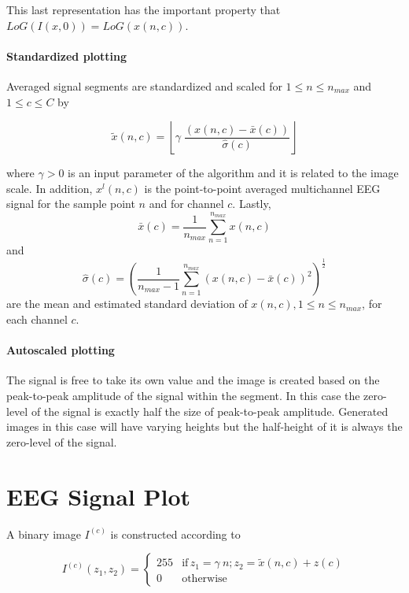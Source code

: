 This last representation has the important property that $ LoG(I(x,0)) = LoG(x(n,c)) $.

\paragraph{Standardized plotting}

Averaged signal segments are standardized and scaled for $1 \leq n \leq n_{max}$ and $1 \leq c \leq C$ by 

\begin{equation}
\tilde{x}(n,c) = \left \lfloor{ \gamma \; \frac{( x(n,c) - \bar{x}(c)  )}{ \hat{\sigma}(c) } }\right \rfloor
\label{eq:standarizedaverages}
\end{equation}

\noindent where $\gamma > 0$ is an input parameter of the algorithm and  it is related to the image scale. In addition, $ x^l(n,c) $ is the point-to-point averaged multichannel EEG signal for the sample point $n$ and for channel $c$. Lastly, $$\bar{x}(c) =\frac{1}{n_{max}}\sum_{n=1}^{n_{max}}x(n,c)$$ and $$ \hat{\sigma}(c) = (\frac{1}{n_{max}-1}\sum_{n=1}^{n_{max}}(x(n,c)-\bar{x}(c))^2 )^{\frac{1}{2}}$$ are the mean and estimated standard deviation of $x(n,c), 1 \leq n \leq n_{max}$, for each channel $c$.

\paragraph{Autoscaled plotting}

The signal is free to take its own value and the image is created based on the peak-to-peak amplitude of the signal within the segment.  In this case the zero-level of the signal is exactly half the size of peak-to-peak amplitude.  Generated images in this case will have varying heights but the half-height of it is always the zero-level of the signal.

\section{EEG Signal Plot}

A binary image $I^{(c)}$ is constructed according to

\begin{equation}
I^{(c)}(z_1,z_2) = \left\{ \begin{array}{rl}
255 & \text{if} \,  z_1 = \gamma \  n; \! z_2 = \tilde{x}(n,c) + z(c) \\
0   & \mbox{otherwise}
\end{array}\right.
\label{eq:images}
\end{equation}

